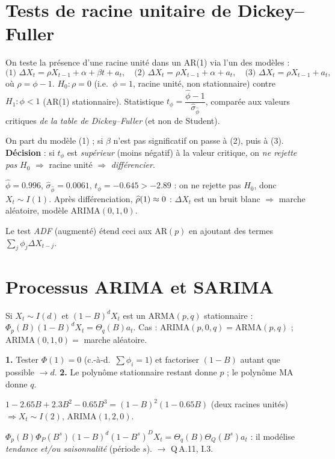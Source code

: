 \documentclass[11pt]{report}
\begin{document}
\section{Tests de racine unitaire de Dickey--Fuller}
\begin{definition}[DF simple]
On teste la présence d'une racine unité dans un AR(1) via l'un des modèles :
\[
\text{(1) }\Delta X_t=\rho X_{t-1}+\alpha+\beta t+a_t,\quad
\text{(2) }\Delta X_t=\rho X_{t-1}+\alpha+a_t,\quad
\text{(3) }\Delta X_t=\rho X_{t-1}+a_t,
\]
où $\rho=\phi-1$. $H_0:\rho=0$ (i.e.\ $\phi=1$, racine unité, non stationnaire) contre
$H_1:\phi<1$ (AR(1) stationnaire). Statistique
$t_\phi=\dfrac{\hat\phi-1}{\hat\sigma_{\hat\phi}}$, comparée aux valeurs critiques
\emph{de la table de Dickey--Fuller} (et non de Student).
\end{definition}
\begin{methode}
On part du modèle (1) ; si $\beta$ n'est pas significatif on passe à (2), puis à (3).
\textbf{Décision} : si $t_\phi$ est \emph{supérieur} (moins négatif) à la valeur critique, on
\emph{ne rejette pas} $H_0$ $\Rightarrow$ racine unité $\Rightarrow$ \emph{différencier}.
\end{methode}
\begin{exemple}[$\to$ Q\,F.4]
$\hat\phi=0.996$, $\hat\sigma_{\hat\phi}=0.0061$, $t_\phi=-0.645>-2.89$ : on ne rejette pas
$H_0$, donc $X_t\sim I(1)$. Après différenciation, $\widehat{\rho}(1)\approx0$ : $\Delta X_t$ est un
bruit blanc $\Rightarrow$ marche aléatoire, modèle ARIMA$(0,1,0)$.
\end{exemple}
Le test \emph{ADF} (augmenté) étend ceci aux AR$(p)$ en ajoutant des termes
$\sum_j\phi_j\Delta X_{t-j}$.

\section{Processus ARIMA et SARIMA}
\begin{definition}[ARIMA$(p,d,q)$]
Si $X_t\sim I(d)$ et $(1-B)^dX_t$ est un ARMA$(p,q)$ stationnaire :
$\Phi_p(B)(1-B)^dX_t=\Theta_q(B)a_t$. Cas : ARIMA$(p,0,q)=$ARMA$(p,q)$ ;
ARIMA$(0,1,0)=$ marche aléatoire.
\end{definition}
\begin{recette}[Trouver $(p,d,q)$ ; $\to$ Q\,F.1, F.2, F.3, J.13]
\textbf{1.} Tester $\Phi(1)=0$ (c.-à-d.\ $\sum\phi_i=1$) et factoriser $(1-B)$ autant que
possible $\to d$. \textbf{2.} Le polynôme stationnaire restant donne $p$ ; le polynôme MA
donne $q$.
\end{recette}
\begin{exemple}[$\to$ Q\,F.1]
$1-2.65B+2.3B^2-0.65B^3=(1-B)^2(1-0.65B)$ (deux racines unités) $\Rightarrow X_t\sim I(2)$,
ARIMA$(1,2,0)$.
\end{exemple}
\begin{definition}[SARIMA]
$\Phi_p(B)\Phi_P(B^s)(1-B)^d(1-B^s)^DX_t=\Theta_q(B)\Theta_Q(B^s)a_t$ : il modélise
\emph{tendance et/ou saisonnalité} (période $s$). $\to$ Q\,A.11, I.3.
\end{definition}
\end{document}
